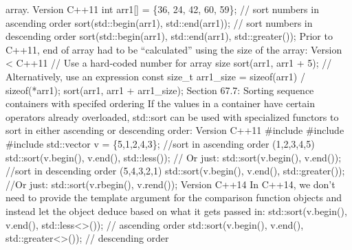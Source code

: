 array. Version C++11 int arr1{[}{]} = \{36, 24, 42, 60, 59\}; // sort
numbers in ascending order sort(std::begin(arr1), std::end(arr1)); //
sort numbers in descending order sort(std::begin(arr1), std::end(arr1),
std::greater()); Prior to C++11, end of array had to be ``calculated''
using the size of the array: Version \textless{} C++11 // Use a
hard-coded number for array size sort(arr1, arr1 + 5); // Alternatively,
use an expression const size\_t arr1\_size = sizeof(arr1) /
sizeof(*arr1); sort(arr1, arr1 + arr1\_size); Section 67.7: Sorting
sequence containers with specifed ordering If the values in a container
have certain operators already overloaded, std::sort can be used with
specialized functors to sort in either ascending or descending order:
Version C++11 \#include \#include \#include std::vector v =
\{5,1,2,4,3\}; //sort in ascending order (1,2,3,4,5)
std::sort(v.begin(), v.end(), std::less()); // Or just:
std::sort(v.begin(), v.end()); //sort in descending order (5,4,3,2,1)
std::sort(v.begin(), v.end(), std::greater()); //Or just:
std::sort(v.rbegin(), v.rend()); Version C++14 In C++14, we don't need
to provide the template argument for the comparison function objects and
instead let the object deduce based on what it gets passed in:
std::sort(v.begin(), v.end(), std::less\textless\textgreater()); //
ascending order std::sort(v.begin(), v.end(),
std::greater\textless\textgreater()); // descending order

